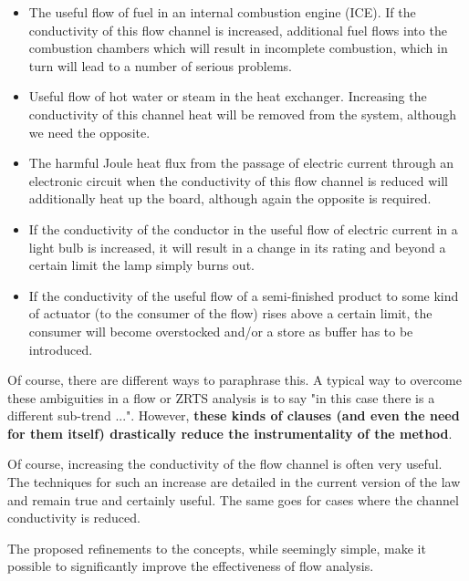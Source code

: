 \documentclass[a4paper,11pt]{article}
\begin{document}
\begin{itemize}
\item The useful flow of fuel in an internal combustion engine (ICE). If the
  conductivity of this flow channel is increased, additional fuel flows into
  the combustion chambers which will result in incomplete combustion, which in
  turn will lead to a number of serious problems.
\item Useful flow of hot water or steam in the heat exchanger. Increasing the
  conductivity of this channel heat will be removed from the system, although
  we need the opposite.
\item The harmful Joule heat flux from the passage of electric current through
  an electronic circuit when the conductivity of this flow channel is reduced
  will additionally heat up the board, although again the opposite is
  required.
\item If the conductivity of the conductor in the useful flow of electric
  current in a light bulb is increased, it will result in a change in its
  rating and beyond a certain limit the lamp simply burns out.
\item If the conductivity of the useful flow of a semi-finished product to
  some kind of actuator (to the consumer of the flow) rises above a certain
  limit, the consumer will become overstocked and/or a store as buffer has to
  be introduced.
\end{itemize}
Of course, there are different ways to paraphrase this. A typical way to
overcome these ambiguities in a flow or ZRTS analysis is to say "in this case
there is a different sub-trend ...".  However, \textbf{these kinds of clauses
  (and even the need for them itself) drastically reduce the instrumentality
  of the method}.

Of course, increasing the conductivity of the flow channel is often very
useful. The techniques for such an increase are detailed in the current
version of the law and remain true and certainly useful. The same goes for
cases where the channel conductivity is reduced.

The proposed refinements to the concepts, while seemingly simple, make it
possible to significantly improve the effectiveness of flow analysis.
\end{document}
